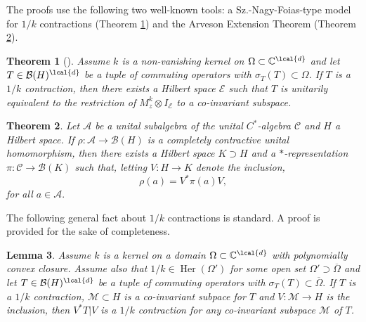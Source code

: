 \documentclass[a4paper,reqno,index]{amsart}
\numberwithin{equation}{section}
\newtheorem{theorem}{Theorem}[section]
\newtheorem{lemma}[theorem]{Lemma}
\newcommand{\cM}{\mathcal{M}}
\newcommand{\specT}{\sigma_T}  %
\newcommand{\ol}[1]{\overline{#1}}
\newcommand{\Her}{\operatorname{Her}}
\theoremstyle{definition}
\begin{document}
The proofs use the following two well-known tools: a Sz.-Nagy-Foias-type model for $1/k$ contractions (Theorem \ref{arazyenglis}) and the Arveson Extension Theorem (Theorem \ref{Arvesonsext}). 

  \begin{theorem}[{\cite[Corollary~7]{Polynomialarazyenglis}}]
 \label{arazyenglis}
Assume $k$ is a non-vanishing kernel on $\Omega\subset\mathbb{C}^{\lcal{d}}$ and let $T\in\mathcal{B}(H)^{\lcal{d}}$ be a  tuple of commuting operators with $\specT(T)\subset \Omega$. If $T$ is a $1/k$ contraction, then there exists a Hilbert space $\mathcal{E}$ such that $T$ is unitarily equivalent to the restriction of $M^k_z\otimes I_{\mathcal{E}}$ to a co-invariant subspace. 
 \end{theorem}

 
\begin{theorem}\label{Arvesonsext}
Let $\mathcal{A}$ be a unital subalgebra of the unital $C^*$-algebra $\mathcal{C}$ and $H$ a Hilbert space. If $\rho: \mathcal{A}\to\mathcal{B}(H)$ is a completely contractive unital homomorphism, then there exists a Hilbert space $K\supset H$ and a $*$-representation $\pi: \mathcal{C}\to\mathcal{B}(K)$ such that,
letting $V:H\to K$ denote the inclusion, 
\[
 \rho(a)=V^* \pi(a) V, 
\]
for all $a\in\mathcal{A}.$ 
\end{theorem}\noindent




The following general fact about $1/k$ contractions is standard. A proof is provided for the sake of completeness. 


\begin{lemma}\label{compresstocoinv}
Assume $k$ is a kernel on a domain $\Omega\subset\mathbb{C}^{\lcal{d}}$ with polynomially convex closure. Assume also that $1/k\in\Her(\Omega')$ for some open set $\Omega'\supset\ol{\Omega}$ and let $T\in \mathcal{B}(H)^{\lcal{d}}$ be a  tuple of commuting operators with $\specT(T)\subset \overline{\Omega}.$ If $T$ is a $1/k$ contraction, $\cM\subset H$ is a co-invariant subpace for $T$ and
$V:\cM\to H$ is the inclusion,  then $V^* T| V$ is a $1/k$ contraction for any co-invariant subspace $\mathcal{M}$ of $T$.
\end{lemma}
\end{document}
